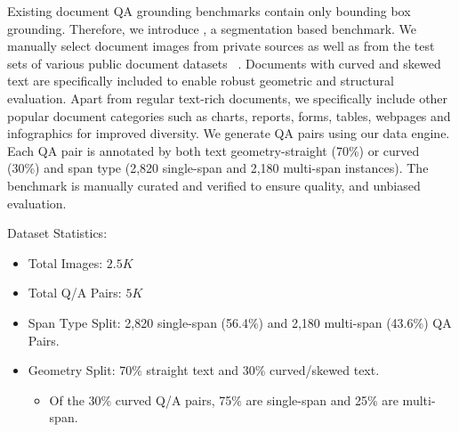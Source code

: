 Existing document QA grounding benchmarks \cite{zhou2025dogr, zhu2024mmdocbench, giovannini2025boundingdocs} contain only bounding box grounding. Therefore, we introduce \textbf{\benchmarkName}, a segmentation based benchmark. We manually select document images from private sources as well as from the test sets of various public document datasets ~\cite{mathew2021docvqa, tanaka2021visualmrc, mathew2022infographicvqa, long2023icdar,yamaguchi2021canvasvae,larson-etal-2023-evaluation-rvlcdip,movie_posters_100k_controlnet, kondic2025chartgen, yang2025scaling, liu2024synchart}. Documents with  curved and skewed text are specifically included to enable robust geometric and structural evaluation. Apart from regular text-rich documents, we specifically include other popular document categories such as charts, reports, forms, tables, webpages and infographics for improved diversity.  
We generate QA pairs using our data engine.  Each QA pair is annotated by both text geometry-straight (70\%) or curved (30\%) and span type (2,820 single-span and 2,180 multi-span instances). 
The benchmark is manually curated and verified to ensure quality, and unbiased evaluation.

\noindent Dataset Statistics: 
\begin{itemize}
    \item Total Images: $2.5K$
    \item Total Q/A Pairs: $5K$
    \item Span Type Split: 2,820 single-span (56.4\%) and 2,180 multi-span (43.6\%) QA Pairs.
    \item Geometry Split: 70\% straight text and 30\% curved/skewed text.
    \begin{itemize}
        \item Of the 30\% curved Q/A pairs, 75\% are single-span and 25\% are multi-span.
    \end{itemize}
\end{itemize}



